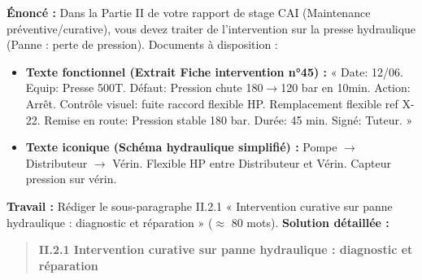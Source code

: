 \documentclass[11pt]{article}
\begin{document}
\begin{exoresolu}
    \textbf{Énoncé :} Dans la Partie II de votre rapport de stage CAI (Maintenance préventive/curative), vous devez traiter de l'intervention sur la presse hydraulique (Panne : perte de pression). Documents à disposition :
    \begin{itemize}
        \item \textbf{Texte fonctionnel (Extrait Fiche intervention n°45) :} « Date: 12/06. Equip: Presse 500T. Défaut: Pression chute 180$\rightarrow$120 bar en 10min. Action: Arrêt. Contrôle visuel: fuite raccord flexible HP. Remplacement flexible ref X-22. Remise en route: Pression stable 180 bar. Durée: 45 min. Signé: Tuteur. »
        \item \textbf{Texte iconique (Schéma hydraulique simplifié) :} Pompe $\rightarrow$ Distributeur $\rightarrow$ Vérin. Flexible HP entre Distributeur et Vérin. Capteur pression sur vérin.
    \end{itemize}
    \textbf{Travail :} Rédiger le sous-paragraphe II.2.1 « Intervention curative sur panne hydraulique : diagnostic et réparation » ($\approx$ 80 mots).
    \tcblower
    \textbf{Solution détaillée :}
    \begin{quote}
        \textbf{II.2.1 Intervention curative sur panne hydraulique : diagnostic et réparation}
        

\end{quote}
\end{exoresolu}
\end{document}
